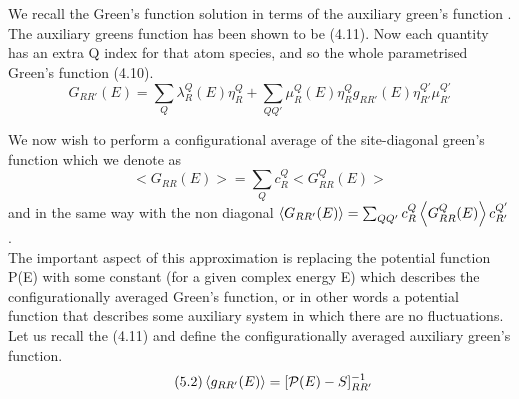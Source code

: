 \documentclass[12pt]{article}
\begin{document}
We recall the Green's function solution in terms of the auxiliary green's function \cite{andersen}.
The auxiliary greens function has been shown to be (4.11).
Now each quantity has an extra Q index for that atom species, and so the whole parametrised Green's function (4.10).
\begin{equation} \label{4.1} \tag{5.1}
G_{RR'}(E)= \sum_Q \lambda_R^Q(E)\eta_R^Q +\sum_{QQ'} \mu_R^Q(E) \eta_R^Q g_{RR'}(E) \eta_{R'}^{Q'} \mu_{R'}^{Q'}
\end{equation}

We now wish to perform a configurational average of the site-diagonal green's function which we denote as $$<G_{RR}(E)>= \sum_Q c_R^Q <G_{RR}^Q(E)>$$ and in the same way with the non diagonal $\expval{G_{RR'}(E)}= \sum_{QQ'} c_R^Q \expval{G_{RR}^Q(E)} c_{R'}^{Q'}$.
\\ 
The important aspect of this approximation is replacing the potential function P(E) with some constant (for a given complex energy E) which describes the configurationally averaged Green's function, or in other words a potential function that describes some auxiliary system in which there are no fluctuations. Let us recall the (4.11) and define the configurationally averaged auxiliary green's function.
\begin{equation} \label{4.1} \tag{5.2}
\expval{g_{RR'}(E)}=[\mathcal{P}(E)-S]^{-1}_{RR'}
\end{equation}
\end{document}

